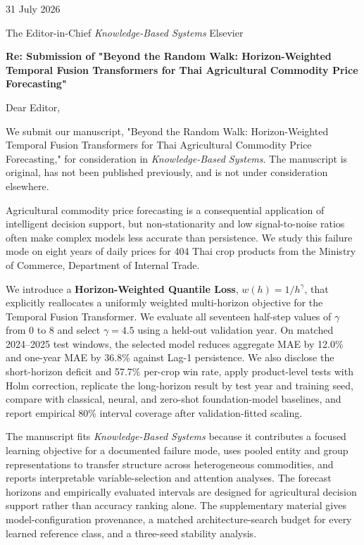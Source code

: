 \documentclass[10pt]{article}
\begin{document}
31 July 2026

The Editor-in-Chief \newline
\emph{Knowledge-Based Systems} \newline
Elsevier

\textbf{Re: Submission of "Beyond the Random Walk: Horizon-Weighted Temporal Fusion Transformers for Thai Agricultural Commodity Price Forecasting"}

Dear Editor,

We submit our manuscript, "Beyond the Random Walk: Horizon-Weighted Temporal Fusion Transformers for Thai Agricultural Commodity Price Forecasting," for consideration in \emph{Knowledge-Based Systems}. The manuscript is original, has not been published previously, and is not under consideration elsewhere.

Agricultural commodity price forecasting is a consequential application of intelligent decision support, but non-stationarity and low signal-to-noise ratios often make complex models less accurate than persistence. We study this failure mode on eight years of daily prices for 404 Thai crop products from the Ministry of Commerce, Department of Internal Trade.

We introduce a \textbf{Horizon-Weighted Quantile Loss}, $w(h)=1/h^\gamma$, that explicitly reallocates a uniformly weighted multi-horizon objective for the Temporal Fusion Transformer. We evaluate all seventeen half-step values of $\gamma$ from 0 to 8 and select $\gamma=4.5$ using a held-out validation year. On matched 2024--2025 test windows, the selected model reduces aggregate MAE by 12.0\% and one-year MAE by 36.8\% against Lag-1 persistence. We also disclose the short-horizon deficit and 57.7\% per-crop win rate, apply product-level tests with Holm correction, replicate the long-horizon result by test year and training seed, compare with classical, neural, and zero-shot foundation-model baselines, and report empirical 80\% interval coverage after validation-fitted scaling.

The manuscript fits \emph{Knowledge-Based Systems} because it contributes a focused learning objective for a documented failure mode, uses pooled entity and group representations to transfer structure across heterogeneous commodities, and reports interpretable variable-selection and attention analyses. The forecast horizons and empirically evaluated intervals are designed for agricultural decision support rather than accuracy ranking alone. The supplementary material gives model-configuration provenance, a matched architecture-search budget for every learned reference class, and a three-seed stability analysis.
\end{document}
